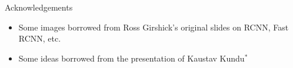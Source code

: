 \begin{frame}
	\begin{block}{Acknowledgements}
		\begin{itemize}\justifying
			\item Some images borrowed from Ross Girshick's original slides on RCNN, Fast RCNN, etc. 
			\item Some ideas borrowed from the presentation of Kaustav Kundu$^*$ 
		\end{itemize}
	\end{block}
\end{frame}
